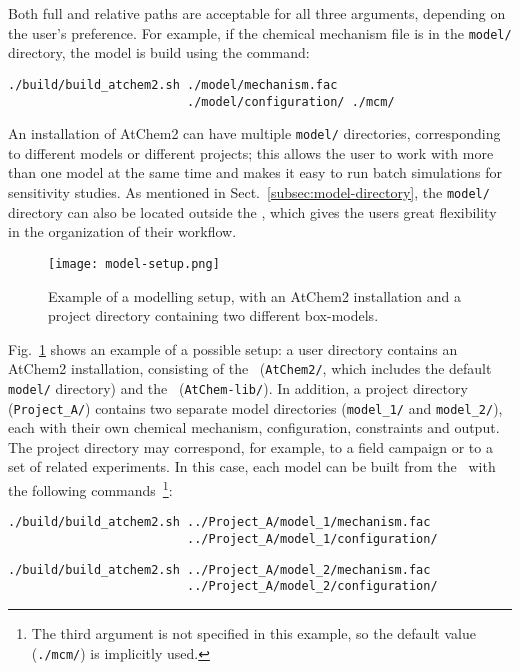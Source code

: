 Both full and relative paths are acceptable for all three arguments,
depending on the user's preference. For example, if the chemical
mechanism file is in the \texttt{model/} directory, the model is build
using the command:

\begin{verbatim}
./build/build_atchem2.sh ./model/mechanism.fac
                         ./model/configuration/ ./mcm/
\end{verbatim}

An installation of AtChem2 can have multiple \texttt{model/}
directories, corresponding to different models or different projects;
this allows the user to work with more than one model at the same time
and makes it easy to run batch simulations for sensitivity studies. As
mentioned in Sect.~\ref{subsec:model-directory}, the \texttt{model/}
directory can also be located outside the \maindir, which gives the
users great flexibility in the organization of their workflow.

\begin{figure}[htb]
  \centering
  \texttt{[image: model-setup.png]}
  \caption{Example of a modelling setup, with an AtChem2 installation
    and a project directory containing two different box-models.}
  \label{fig:setup}
\end{figure}

Fig.~\ref{fig:setup} shows an example of a possible setup: a user
directory contains an AtChem2 installation, consisting of the
\maindir\ (\texttt{AtChem2/}, which includes the default
\texttt{model/} directory) and the \depdir\ (\texttt{AtChem-lib/}). In
addition, a project directory (\texttt{Project\_A/}) contains two
separate model directories (\texttt{model\_1/} and
\texttt{model\_2/}), each with their own chemical mechanism,
configuration, constraints and output. The project directory may
correspond, for example, to a field campaign or to a set of related
experiments. In this case, each model can be built from the \maindir\
with the following commands~\footnote{The third argument is not
  specified in this example, so the default value (\texttt{./mcm/}) is
  implicitly used.}:

\begin{verbatim}
./build/build_atchem2.sh ../Project_A/model_1/mechanism.fac
                         ../Project_A/model_1/configuration/
\end{verbatim}

\begin{verbatim}
./build/build_atchem2.sh ../Project_A/model_2/mechanism.fac
                         ../Project_A/model_2/configuration/
\end{verbatim}

